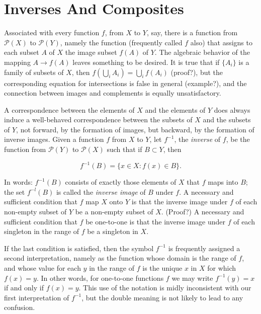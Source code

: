 
\chapter{Inverses And Composites}

Associated with every function $f$, from $X$ to $Y$, say, there is a function from $\mathcal{P}(X)$ to $\mathcal{P}(Y)$, namely the function (frequently called $f$ also) that assigns to each subset $A$ of $X$ the image subset $f(A)$ of $Y$. The algebraic behavior of the mapping $A \rightarrow f(A)$ leaves something to be desired. It is true that if $ \{ A_{i} \} $ is a family of subsets of $X$, then $f( \bigcup_{i} A_{i} ) = \bigcup_{i} f( A_{i} )$ (proof?), but the corresponding equation for intersections is false in general (example?), and the connection between images and complements is equally unsatisfactory. 

A correspondence between the elements of $X$ and the elements of $Y$ does always induce a well-behaved correspondence between the subsets of $X$ and the subsets of $Y$, not forward, by the formation of images, but backward, by the formation of inverse images. Given a function $f$ from $X$ to $Y$, let $f^{-1}$, the \textit{inverse} of $f$, be the function from $\mathcal{P}(Y)$ to $\mathcal{P}(X)$ such that if $B \subset Y$, then

\begin{equation*}
f^{-1}(B) = \{ x \in X : f(x) \in B \} .
\end{equation*}

In words: $f^{-1}(B)$ consists of exactly those elements of $X$ that $f$ maps into $B$; the set $f^{-l}(B)$ is called the \textit{inverse image} of $B$ under $f$. A necessary and sufficient condition that $f$ map $X$ onto $Y$ is that the inverse image under $f$ of each non-empty subset of $Y$ be a non-empty subset of $X$. (Proof?) A necessary and sufficient condition that $f$ be one-to-one is that the inverse image under $f$ of each singleton in the range of $f$ be a singleton in $X$. 

If the last condition is satisfied, then the symbol $f^{-1}$ is frequently assigned a second interpretation, namely as the function whose domain is the range of $f$, and whose value for each $y$ in the range of $f$ is the unique $x$ in $X$ for which $f(x) = y$. In other words, for one-to-one functions $f$ we may write $f^{-1}(y) = x$ if and only if $f(x) = y$. This use of the notation is midly inconsistent with our first interpretation of $f^{-1}$, but the double meaning is not likely to lead to any confusion.

